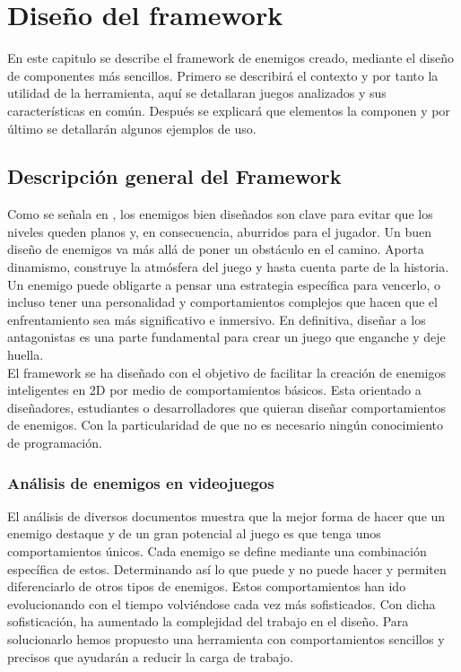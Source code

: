 
\chapter{Diseño del framework}
\label{cap:descripcionTrabajo}
En este capitulo se describe el framework de enemigos creado, mediante el diseño de componentes más sencillos. 
Primero se describirá el contexto y por tanto la utilidad de la herramienta, aquí se detallaran juegos analizados y sus características en común. Después se explicará que elementos la componen y por último se detallarán algunos ejemplos de uso. \\
\section{Descripción general del Framework}
Como se señala en  \citet{Build_a_Bad_Guy_Workshop}, los enemigos bien diseñados son clave para evitar que los niveles queden planos y, en consecuencia, aburridos para el jugador.
Un buen diseño de enemigos va más allá de poner un obstáculo en el camino. Aporta dinamismo, construye la atmósfera del juego y hasta cuenta parte de la historia. Un enemigo puede obligarte a pensar una estrategia específica para vencerlo, o incluso tener una personalidad y comportamientos complejos que hacen que el enfrentamiento sea más significativo e inmersivo. En definitiva, diseñar a los antagonistas es una parte fundamental para crear un juego que enganche y deje huella.\\

El framework se ha diseñado con el objetivo de facilitar la creación de enemigos inteligentes en 2D por medio de comportamientos básicos. Esta orientado a diseñadores, estudiantes o desarrolladores que quieran diseñar comportamientos de enemigos. Con la particularidad de que no es necesario ningún conocimiento de programación.

\subsection{Análisis de enemigos en videojuegos}
El análisis de diversos documentos muestra que la mejor forma de hacer que un enemigo destaque y de un gran potencial al juego es que tenga unos comportamientos únicos. Cada enemigo se define mediante una combinación específica de estos. Determinando así lo que puede y no puede hacer  y permiten diferenciarlo de otros tipos de enemigos. Estos comportamientos han ido evolucionando con el tiempo volviéndose cada vez más sofisticados. Con dicha sofisticación, ha aumentado la complejidad del trabajo en el diseño. Para solucionarlo hemos propuesto una herramienta con comportamientos sencillos y precisos que ayudarán a reducir la carga de trabajo. 

